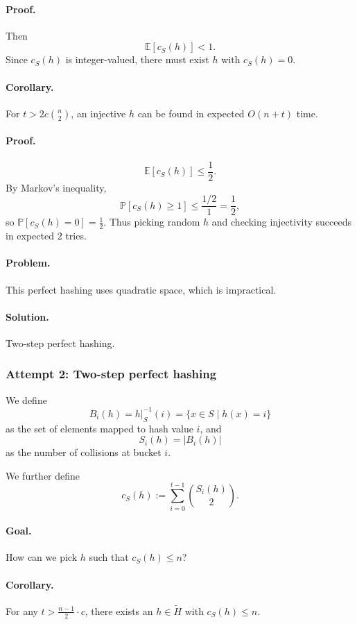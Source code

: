\documentclass{article}
\begin{document}
\paragraph{Proof.}  
Then
\[
\mathbb{E}[c_S(h)] < 1.
\]
Since $c_S(h)$ is integer-valued, there must exist $h$ with $c_S(h)=0$.

\paragraph{Corollary.}  
For $t > 2c\binom{n}{2}$, an injective $h$ can be found in expected $O(n+t)$ time.

\paragraph{Proof.}
\[
\mathbb{E}[c_S(h)] \le \frac12.
\]
By Markov’s inequality,
\[
\mathbb{P}[c_S(h)\ge 1] \le \frac{1/2}{1} = \frac12,
\]
so $\mathbb{P}[c_S(h)=0]=\frac12$.  
Thus picking random $h$ and checking injectivity succeeds in expected $2$ tries.

\paragraph{Problem.}   \label{par:quadraticspacehashing}
This perfect hashing uses quadratic space, which is impractical.

\paragraph{Solution.}  
Two-step perfect hashing.
\subsubsection{Attempt 2: Two-step perfect hashing}

We define
\[
B_i(h) = h|_S^{-1}(i) = \{x \in S \mid h(x) = i\}
\]
as the set of elements mapped to hash value \(i\), and
\[
S_i(h) = |B_i(h)|
\]
as the number of collisions at bucket \(i\).

We further define
\[
c_S(h) := \sum_{i=0}^{t-1} \binom{S_i(h)}{2}.
\]

\paragraph{Goal.}
How can we pick \(h\) such that \(c_S(h) \le n\)?

\paragraph{Corollary.}
For any \(t > \frac{n-1}{2} \cdot c\), there exists an \(h \in \tilde{H}\) with \(c_S(h) \le n\).
\end{document}

